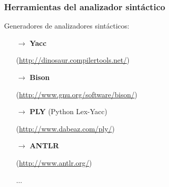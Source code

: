 \documentclass{beamer}
\begin{document}
		\begin{frame}
			\frametitle{Herramientas del analizador sint\'actico}

			\begin{block}{Generadores de analizadores sint\'acticos:}
			 \begin{itemize}
                \item[$\rightarrow$] \textbf{Yacc}
                \item[] (\url{http://dinosaur.compilertools.net/})
                \item[$\rightarrow$] \textbf{Bison}
                \item[] (\url{http://www.gnu.org/software/bison/})
                \item[$\rightarrow$] \textbf{PLY} (Python Lex-Yacc)
                \item[] (\url{http://www.dabeaz.com/ply/})
                \item[$\rightarrow$] \textbf{ANTLR}
                \item[] (\url{http://www.antlr.org/})
                \item[] $\ldots$
			  \end{itemize}
			\end{block}
		\end{frame}
\end{document}
